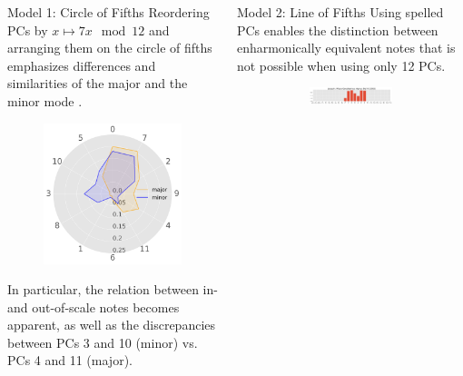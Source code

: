 \documentclass[final,cmyk]{beamer}
\begin{document}
\begin{frame}[t]
\begin{minipage}[t][.69\textheight][t]{\textwidth}
\begin{columns}[t]
\begin{column}{0.3\textwidth}
      \begin{block}{Model 1: Circle of Fifths}
				\alert{Reordering} PCs by $x\mapsto 7x \mod 12$ and arranging them on the \alert{circle of fifths} emphasizes differences and similarities of the major and the minor mode \autocite{Harasim2019}.
        \begin{figure}
          \centering
          \includegraphics[width=.8\textwidth]{img/radars}
        \end{figure}

				In particular, the relation between in- and out-of-scale notes becomes apparent,
				as well as the discrepancies between PCs 3 and 10 (minor) vs. PCs 4 and 11 (major).

      \end{block}


    \end{column}

    \begin{column}{0.3\textwidth}

      \begin{block}{Model 2: Line of Fifths}
        Using \alert{spelled PCs} enables the distinction between enharmonically equivalent notes
				that is not possible when using only 12 PCs.
        \begin{figure}
				\centering

				\begin{subfigure}{\textwidth} %
					\includegraphics[width=\textwidth]{img/gmm_josquin.png}
				\end{subfigure}


\end{figure}
\end{block}
\end{column}
\end{columns}
\end{minipage}
\end{frame}
\end{document}
